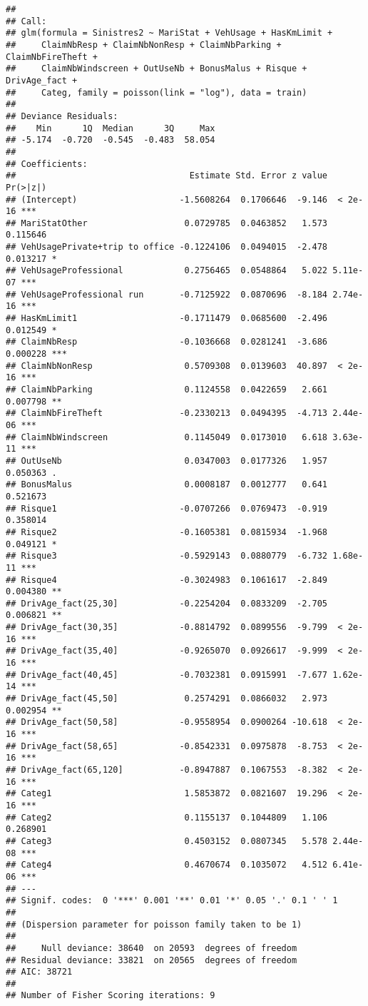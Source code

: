\documentclass[
]{article}
\begin{document}
\begin{verbatim}
## 
## Call:
## glm(formula = Sinistres2 ~ MariStat + VehUsage + HasKmLimit + 
##     ClaimNbResp + ClaimNbNonResp + ClaimNbParking + ClaimNbFireTheft + 
##     ClaimNbWindscreen + OutUseNb + BonusMalus + Risque + DrivAge_fact + 
##     Categ, family = poisson(link = "log"), data = train)
## 
## Deviance Residuals: 
##    Min      1Q  Median      3Q     Max  
## -5.174  -0.720  -0.545  -0.483  58.054  
## 
## Coefficients:
##                                  Estimate Std. Error z value Pr(>|z|)    
## (Intercept)                    -1.5608264  0.1706646  -9.146  < 2e-16 ***
## MariStatOther                   0.0729785  0.0463852   1.573 0.115646    
## VehUsagePrivate+trip to office -0.1224106  0.0494015  -2.478 0.013217 *  
## VehUsageProfessional            0.2756465  0.0548864   5.022 5.11e-07 ***
## VehUsageProfessional run       -0.7125922  0.0870696  -8.184 2.74e-16 ***
## HasKmLimit1                    -0.1711479  0.0685600  -2.496 0.012549 *  
## ClaimNbResp                    -0.1036668  0.0281241  -3.686 0.000228 ***
## ClaimNbNonResp                  0.5709308  0.0139603  40.897  < 2e-16 ***
## ClaimNbParking                  0.1124558  0.0422659   2.661 0.007798 ** 
## ClaimNbFireTheft               -0.2330213  0.0494395  -4.713 2.44e-06 ***
## ClaimNbWindscreen               0.1145049  0.0173010   6.618 3.63e-11 ***
## OutUseNb                        0.0347003  0.0177326   1.957 0.050363 .  
## BonusMalus                      0.0008187  0.0012777   0.641 0.521673    
## Risque1                        -0.0707266  0.0769473  -0.919 0.358014    
## Risque2                        -0.1605381  0.0815934  -1.968 0.049121 *  
## Risque3                        -0.5929143  0.0880779  -6.732 1.68e-11 ***
## Risque4                        -0.3024983  0.1061617  -2.849 0.004380 ** 
## DrivAge_fact(25,30]            -0.2254204  0.0833209  -2.705 0.006821 ** 
## DrivAge_fact(30,35]            -0.8814792  0.0899556  -9.799  < 2e-16 ***
## DrivAge_fact(35,40]            -0.9265070  0.0926617  -9.999  < 2e-16 ***
## DrivAge_fact(40,45]            -0.7032381  0.0915991  -7.677 1.62e-14 ***
## DrivAge_fact(45,50]             0.2574291  0.0866032   2.973 0.002954 ** 
## DrivAge_fact(50,58]            -0.9558954  0.0900264 -10.618  < 2e-16 ***
## DrivAge_fact(58,65]            -0.8542331  0.0975878  -8.753  < 2e-16 ***
## DrivAge_fact(65,120]           -0.8947887  0.1067553  -8.382  < 2e-16 ***
## Categ1                          1.5853872  0.0821607  19.296  < 2e-16 ***
## Categ2                          0.1155137  0.1044809   1.106 0.268901    
## Categ3                          0.4503152  0.0807345   5.578 2.44e-08 ***
## Categ4                          0.4670674  0.1035072   4.512 6.41e-06 ***
## ---
## Signif. codes:  0 '***' 0.001 '**' 0.01 '*' 0.05 '.' 0.1 ' ' 1
## 
## (Dispersion parameter for poisson family taken to be 1)
## 
##     Null deviance: 38640  on 20593  degrees of freedom
## Residual deviance: 33821  on 20565  degrees of freedom
## AIC: 38721
## 
## Number of Fisher Scoring iterations: 9
\end{verbatim}
\end{document}

